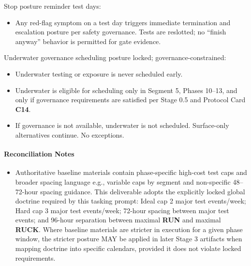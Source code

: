 \documentclass[10pt]{article}
\begin{document}
Stop posture reminder test days:

\begin{itemize}
\item Any red-flag symptom on a test day triggers immediate termination and escalation posture per safety governance. Tests are reslotted; no “finish anyway” behavior is permitted for gate evidence.
\end{itemize}

Underwater governance scheduling posture locked; governance-constrained:

\begin{itemize}
\item Underwater testing or exposure is never scheduled early.
\item Underwater is eligible for scheduling only in Segment 5, Phases 10–13, and only if governance requirements are satisfied per Stage 0.5 and Protocol Card \textbf{C14}.
\item If governance is not available, underwater is not scheduled. Surface-only alternatives continue. No exceptions.
\end{itemize}

\paragraph*{Reconciliation Notes}

\begin{itemize}
\item Authoritative baseline materials contain phase-specific high-cost test caps and broader spacing language e.g., variable caps by segment and non-specific 48–72-hour spacing guidance. This deliverable adopts the explicitly locked global doctrine required by this tasking prompt: Ideal cap 2 major test events/week; Hard cap 3 major test events/week; 72-hour spacing between major test events; and 96-hour separation between maximal \textbf{RUN} and maximal \textbf{RUCK}. Where baseline materials are stricter in execution for a given phase window, the stricter posture MAY be applied in later Stage 3 artifacts when mapping doctrine into specific calendars, provided it does not violate locked requirements.
\end{itemize}
\end{document}
